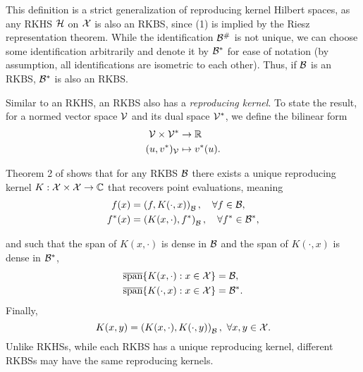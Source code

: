 This definition is a strict generalization of reproducing kernel Hilbert spaces, as any RKHS ${\mathcal{H}}$ on ${\mathcal{X}}$ is also an RKBS, since (1) is implied by the Riesz representation theorem. While the identification ${\mathcal{B}}^\#$ is not unique, we can choose some identification arbitrarily and denote it by ${\mathcal{B}}^*$ for ease of notation (by assumption, all identifications are isometric to each other). Thus, if ${\mathcal{B}}$ is an RKBS, ${\mathcal{B}}^*$ is also an RKBS.

Similar to an RKHS, an RKBS also has a \textit{reproducing kernel}. To state the result, for a normed vector space ${\mathcal{V}}$ and its dual space ${\mathcal{V}}^*$, we define the bilinear form
\begin{equation}\label{eq:bilinear_form}
    \begin{split}
        \calV \times \calV^* &\to \reals\\
        (u, v^*)_\calV &\mapsto v^*(u).
    \end{split}
\end{equation}

Theorem 2 of \citet{zhangReproducingKernel2009} shows that for any RKBS ${\mathcal{B}}$ there exists a unique reproducing kernel $K: {\mathcal{X}} \times {\mathcal{X}} \to {\mathbb{C}}$ that recovers point evaluations, meaning
\begin{align}
    f(x) &= \paren{f, K(\cdot, x)}_\calB, \quad \forall f \in \calB, \\
    f^*(x) &= \paren{K(x, \cdot), f^*}_\calB,\quad \forall f^* \in \calB^*,
\end{align}

and such that the span of $K(x, \cdot)$ is dense in ${\mathcal{B}}$ and the span of $K(\cdot, x)$ is dense in ${\mathcal{B}}^*$,
\begin{align}
    \overline{\text{span}}\{K(x, \cdot): x \in \calX\} &= \calB, \\
    \overline{\text{span}}\{K(\cdot, x): x \in \calX\} &= \calB^*.
\end{align}
Finally,
\begin{equation}
    K(x, y) = \paren{K(x, \cdot), K(\cdot, y)}_\calB, \ \forall x, y \in \calX.
\end{equation}
Unlike RKHSs, while each RKBS has a unique reproducing kernel, different RKBSs may have the same reproducing kernels.


